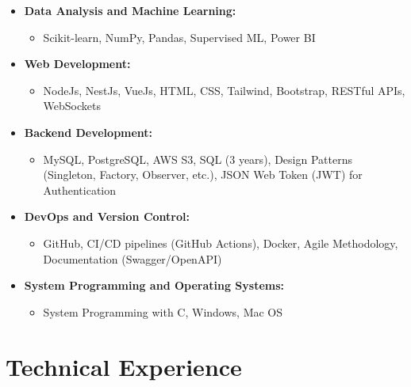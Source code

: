 \documentclass[a4paper,10pt]{article}
\begin{document}
\begin{itemize}
    \item \textbf{Data Analysis and Machine Learning:}
        \begin{itemize}
            \item Scikit-learn, NumPy, Pandas, Supervised ML, Power BI
        \end{itemize}
    \item \textbf{Web Development:}
        \begin{itemize}
            \item NodeJs, NestJs, VueJs, HTML, CSS, Tailwind, Bootstrap, RESTful APIs, WebSockets
        \end{itemize}
    \item \textbf{Backend Development:}
        \begin{itemize}
            \item MySQL, PostgreSQL, AWS S3, SQL (3 years), Design Patterns (Singleton, Factory, Observer, etc.), JSON Web Token (JWT) for Authentication
        \end{itemize}
    \item \textbf{DevOps and Version Control:}
        \begin{itemize}
            \item GitHub, CI/CD pipelines (GitHub Actions), Docker, Agile Methodology, Documentation (Swagger/OpenAPI)
        \end{itemize}
    \item \textbf{System Programming and Operating Systems:}
        \begin{itemize}
            \item System Programming with C, Windows, Mac OS
        \end{itemize}
\end{itemize}

\vspace{2mm}


\section{Technical Experience}
\end{document}

